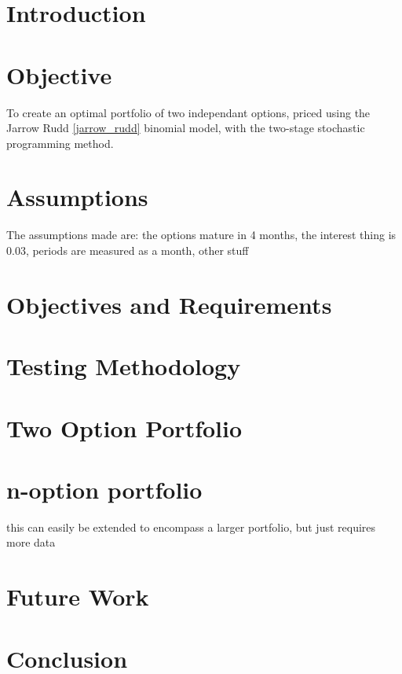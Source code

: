 \documentclass[12pt]{article}
\begin{document}



\newpage 
\doublespacing
{}
\setlength{\parindent}{1cm}

\section{Introduction}

\section{Objective}
To create an optimal portfolio of two independant options, priced using the Jarrow Rudd \ref{jarrow_rudd} binomial model, with the two-stage stochastic programming method.

\section{Assumptions}
The assumptions made are: the options mature in 4 months, the interest thing is 0.03, periods are measured as a month, other stuff

\section{Objectives and Requirements}

\section{Testing Methodology}

\section{Two Option Portfolio}

\section{n-option portfolio}
this can easily be extended to encompass a larger portfolio, but just requires more data

\section{Future Work}

\section{Conclusion}


\newpage
{}




\end{document}
